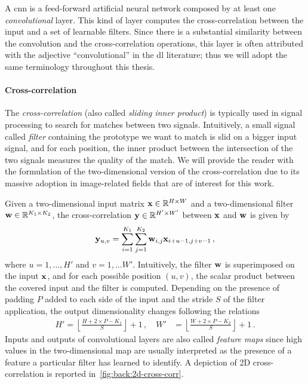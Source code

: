 A \gls{cnn} is a feed-forward artificial neural network composed by at least one \emph{convolutional} layer.
This kind of layer computes the cross-correlation between the input and a set of learnable filters.
Since there is a substantial similarity between the convolution and the cross-correlation operations, this layer is often attributed with the adjective ``convolutional'' in the \gls{dl} literature;
thus we will adopt the same terminology throughout this thesis.

\paragraph{Cross-correlation}
The \emph{cross-correlation} (also called \emph{sliding inner product}) is typically used in signal processing to search for matches between two signals.
Intuitively, a small signal called \emph{filter} containing the prototype we want to match is slid on a bigger input signal, and for each position, the inner product between the intersection of the two signals measures the quality of the match.
We will provide the reader with the formulation of the two-dimensional version of the cross-correlation due to its massive adoption in image-related fields that are of interest for this work.

Given a two-dimensional input matrix $\mathbf{x} \in \mathbb{R}^{H \times W}$ and a two-dimensional filter $\mathbf{w} \in \mathbb{R}^{K_1 \times K_2}$, %
the cross-correlation $\mathbf{y} \in \mathbb{R}^{H' \times W'}$ between $\mathbf{x}$ and $\mathbf{w}$ is given by
%
\begin{equation}\label{eq:back:cross-correlation}
    \mathbf{y}_{u,v} = \sum_{i=1}^{K_1} \sum_{j=1}^{K_2} \mathbf{w}_{i,j} \mathbf{x}_{i+u-1,j+v-1} \,,
\end{equation}
%
where $u = 1, \dots, H'$ and $v = 1, \dots W'$.
Intuitively, the filter $\mathbf{w}$ is superimposed on the input $\mathbf{x}$, and for each possible position $(u,v)$, the scalar product between the covered input and the filter is computed.
Depending on the presence of padding $P$ added to each side of the input and the stride $S$ of the filter application, the output dimensionality changes following the relations
\begin{equation} \label{eq:back:conv-size}
\begin{split}
    H' = \left \lfloor \frac{H + 2 \times P - K_1}{S} \right \rfloor + 1 \,,\quad
    W' &= \left \lfloor \frac{W + 2 \times P - K_2}{S} \right \rfloor + 1 \,.
\end{split}
\end{equation}
Inputs and outputs of convolutional layers are also called \emph{feature maps} since high values in the two-dimensional map are usually interpreted as the presence of a feature a particular filter has learned to identify.
A depiction of 2D cross-correlation is reported in~\ref{fig:back:2d-cross-corr}.

